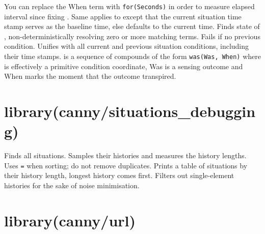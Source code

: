 \begin{description}
\begin{description}
You can replace the When term with \verb$for(Seconds)$ in order to
measure elapsed interval since fixing . Same applies to
 except that the current situation time stamp serves
as the baseline time, else defaults to the current time.
Finds  state of , non-deterministically
resolving zero or more matching  terms. Fails if no
previous  condition.
Unifies  with all current and previous situation
conditions, including their time stamps.  is a sequence
of compounds of the form \verb$was(Was, When)$ where  is
effectively a primitive condition coordinate, Was is a sensing
outcome and When marks the moment that the outcome transpired.
\end{description}
\end{description}

\chapter{library(canny/situations_debugging)}\label{sec:situationsdebugging}

\begin{description}
Finds all situations. Samples their histories and measures the
history lengths. Uses \verb$=$ when sorting; do not remove duplicates.
Prints a table of situations by their history length, longest
history comes first. Filters out single-element histories for the
sake of noise minimisation.
\end{description}

\chapter{library(canny/url)}\label{sec:url}

